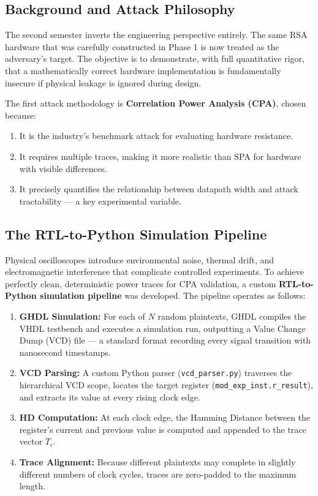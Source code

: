 \documentclass[conference, a4paper]{IEEEtran}
\begin{document}
\subsection{Background and Attack Philosophy}

The second semester inverts the engineering perspective entirely. The same RSA hardware that was carefully constructed in Phase 1 is now treated as the adversary's target. The objective is to demonstrate, with full quantitative rigor, that a mathematically correct hardware implementation is fundamentally insecure if physical leakage is ignored during design.

The first attack methodology is \textbf{Correlation Power Analysis (CPA)}, chosen because:
\begin{enumerate}
    \item It is the industry's benchmark attack for evaluating hardware resistance.
    \item It requires multiple traces, making it more realistic than SPA for hardware with visible differences.
    \item It precisely quantifies the relationship between datapath width and attack tractability — a key experimental variable.
\end{enumerate}

\subsection{The RTL-to-Python Simulation Pipeline}

Physical oscilloscopes introduce environmental noise, thermal drift, and electromagnetic interference that complicate controlled experiments. To achieve perfectly clean, deterministic power traces for CPA validation, a custom \textbf{RTL-to-Python simulation pipeline} was developed. The pipeline operates as follows:

\begin{enumerate}
    \item \textbf{GHDL Simulation:} For each of $N$ random plaintexts, GHDL compiles the VHDL testbench and executes a simulation run, outputting a Value Change Dump (VCD) file — a standard format recording every signal transition with nanosecond timestamps.
    \item \textbf{VCD Parsing:} A custom Python parser (\texttt{vcd\_parser.py}) traverses the hierarchical VCD scope, locates the target register (\texttt{mod\_exp\_inst.r\_result}), and extracts its value at every rising clock edge.
    \item \textbf{HD Computation:} At each clock edge, the Hamming Distance between the register's current and previous value is computed and appended to the trace vector $T_i$.
    \item \textbf{Trace Alignment:} Because different plaintexts may complete in slightly different numbers of clock cycles, traces are zero-padded to the maximum length.
\end{enumerate}
\end{document}
